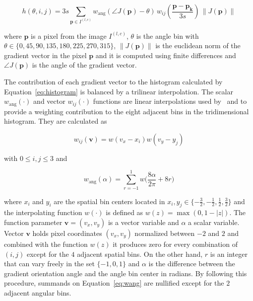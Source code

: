 \documentclass[utf8]{frontiersSCNS} %
\begin{document}
\begin{equation}
 h(\theta,i,j) = 3 s \sum_{\mathbf{p} \in I^{(l,c)}} w_\mathrm{ang}(\angle J(\mathbf{p}) - \theta)\, w_{ij}\left(\frac{\mathbf{p} - \mathbf{p_k}}{3 s}\right)\, \left\lVert J(\mathbf{p}) \right\rVert 
\label{eq:histogram}
\end{equation}

\noindent  where $\mathbf{p}$ is a pixel from the image $I^{(l,c)}$,  $\theta$ is the angle bin with $ \theta \in \{0, 45, 90, 135, 180, 225, 270, 315\} $,  $ \left\lVert J(\mathbf{p}) \right\rVert $ is the euclidean norm of the gradient vector in the pixel $\mathbf{p}$ and it is computed using finite differences and $\angle J(\mathbf{p}) $ is the angle of the gradient vector.  

The contribution of each gradient vector to the histogram calculated by Equation~\ref{eq:histogram} is balanced by a trilinear interpolation.  The scalar $ w_\mathrm{ang}(\cdot) $  and vector $ w_{ij}(\cdot) $ functions are linear interpolations used by~\cite{Lowe2004} and \cite{Vedaldi2010} to provide a weighting contribution to the eight adjacent bins in the tridimensional histogram.  They are calculated as  

\begin{equation}
 w_{ij}(\mathbf{v}) = w( v_x - x_i ) w( v_y - y_j ) 
\label{eq:ij}
\end{equation}

\noindent with $ 0 \leq i,j \leq 3$ and

\begin{equation}
 w_\mathrm{ang}(\alpha) = \sum_{r = -1 }^{1} w \bigg( \frac{8\alpha}{2\pi} + 8r \bigg)
\label{eq:wang}
\end{equation}


\noindent where $x_i$ and $y_i$ are the spatial bin centers located in $ x_i,y_j \in \{-\frac{3}{2},-\frac{1}{2},\frac{1}{2},\frac{3}{2}\} $ and the interpolating function $w(\cdot)$ is defined as $ w(z) = \max(0,1-|z|)$. The function parameter $\mathbf{v} = ( v_x, v_y ) $ is a vector variable and $\alpha$ a scalar variable.  Vector $\mathbf{v}$ holds pixel coordinates $( v_x, v_y ) $ normalized between $-2$ and $2$ and combined with the function $ w(z) $ it produces zero for every combination of $(i,j)$ except for the $4$ adjacent spatial bins.  On the other hand, $r$ is an integer that can vary freely in the set $\{ -1, 0, 1 \} $ and $\alpha$ is the difference between the gradient orientation angle and the angle bin center in radians.  By following this procedure, summands on Equation~\ref{eq:wang} are nullified except for the $2$ adjacent angular bins.
\end{document}
